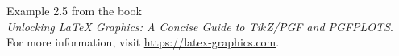 \documentclass{article}
\begin{document}
Example 2.5 from the book\\
\emph{Unlocking LaTeX Graphics: A Concise Guide to Ti$k$Z/PGF and PGFPLOTS}.\\
For more information, visit \url{https://latex-graphics.com}.
\par\bigskip

\end{document}
